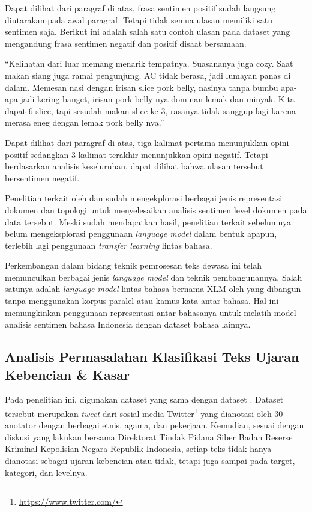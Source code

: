	Dapat dilihat dari paragraf di atas, frasa sentimen positif sudah langsung diutarakan pada awal paragraf. Tetapi tidak semua ulasan memiliki satu sentimen saja. Berikut ini adalah salah satu contoh ulasan pada dataset yang mengandung frasa sentimen negatif dan positif disaat bersamaan. 

	“Kelihatan dari luar memang menarik tempatnya. Suasananya juga cozy. Saat makan siang juga ramai pengunjung. AC tidak berasa, jadi lumayan panas di dalam. Memesan nasi dengan irisan slice pork belly, nasinya tanpa bumbu apa- apa jadi kering banget, irisan pork belly nya dominan lemak dan minyak. Kita dapat 6 slice, tapi sesudah makan slice ke 3, rasanya tidak sanggup lagi karena merasa eneg dengan lemak pork belly nya.”

	Dapat dilihat dari paragraf di atas, tiga kalimat pertama menunjukkan opini positif sedangkan 3 kalimat terakhir menunjukkan opini negatif. Tetapi berdasarkan analisis keseluruhan, dapat dilihat bahwa ulasan tersebut bersentimen negatif.

	Penelitian terkait oleh \parencite{FarhanKhodra2017} dan \parencite{CrisdayantiPurwarianti2019} sudah mengekplorasi berbagai jenis representasi dokumen dan topologi untuk menyelesaikan analisis sentimen level dokumen pada data tersebut. Meski sudah mendapatkan hasil, penelitian terkait sebelumnya belum mengeksplorasi penggunaan \textit{language model} dalam bentuk apapun, terlebih lagi penggunaan \textit{transfer learning} lintas bahasa.

	Perkembangan dalam bidang teknik pemrosesan teks dewasa ini telah memunculkan berbagai jenis \textit{language model} dan teknik pembangunannya. Salah satunya adalah \textit{language model} lintas bahasa bernama XLM oleh \parencite{LampleConneau2019} yang dibangun tanpa menggunakan korpus paralel atau kamus kata antar bahasa. Hal ini memungkinkan penggunaan representasi antar bahasanya untuk melatih model analisis sentimen bahasa Indonesia dengan dataset bahasa lainnya.

	\subsection{Analisis Permasalahan Klasifikasi Teks Ujaran Kebencian \& Kasar}

	Pada penelitian ini, digunakan dataset yang sama dengan dataset \parencite{Ibrohim_Budi_2019}. Dataset tersebut merupakan \textit{tweet} dari sosial media Twitter\footnote{\url{https://www.twitter.com/}} yang dianotasi oleh 30 anotator dengan berbagai etnis, agama, dan pekerjaan. Kemudian, sesuai dengan diskusi yang \parencite{Diksusi_Bareskrim} lakukan bersama Direktorat Tindak Pidana Siber Badan Reserse Kriminal Kepolisian Negara Republik Indonesia, setiap teks tidak hanya dianotasi sebagai ujaran kebencian atau tidak, tetapi juga sampai pada target, kategori, dan levelnya. 

